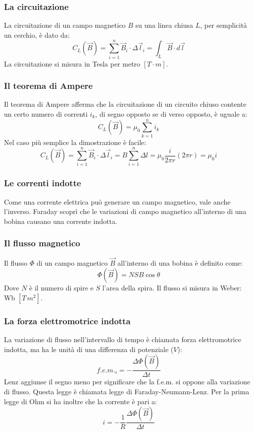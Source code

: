 \documentclass{article}
\begin{document}
\subsubsection{La circuitazione}
La circuitazione di un campo magnetico $B$ su una linea chiusa $L$, per semplicità un cerchio, è dato da:
\begin{equation}
    C_L(\Vec{B})=\sum_{i=1}^n \Vec{B}_i \cdot \Delta \Vec{l}_i=\int_L \Vec{B} \cdot d\Vec{l}
\end{equation}
La circuitazione si misura in Tesla per metro $[T\cdot m]$.

\subsubsection{Il teorema di Ampere}
Il teorema di Ampere afferma che la circuitazione di un circuito chiuso contente un certo numero di correnti $i_k$, di segno opposto se di verso opposto, è uguale a:
\begin{equation}
    C_L(\Vec{B})=\mu_0 \sum_{k=1}^n i_k
\end{equation}
Nel caso più semplice la dimostrazione è facile:
\begin{equation}
    C_L(\Vec{B})=\sum_{i=1}^n \Vec{B}_i \cdot \Delta \Vec{l}_i=B\sum_{i=1}^n \Delta l = \mu_0 \frac{i}{2\pi r}(2\pi r)=\mu_0 i
\end{equation}

\subsubsection{Le correnti indotte}
Come una corrente elettrica può generare un campo magnetico, vale anche l'inverso. Faraday scoprì che le variazioni di campo magnetico all'interno di una bobina causano una corrente indotta. 
\subsubsection{Il flusso magnetico}
Il flusso $\Phi$ di un campo magnetico $\Vec{B}$ all'interno di una bobina è definito come:
\begin{equation}
    \Phi (\Vec{B})=NSB\cos{\theta}
\end{equation}
Dove $N$ è il numero di spire e $S$ l'area della spira. Il flusso si misura in Weber: Wb $[T \, m^2]$.

\subsubsection{La forza elettromotrice indotta}
La variazione di flusso nell'intervallo di tempo è chiamata forza elettromotrice indotta, ma ha le unità di una differenza di potenziale ($V$):
\begin{equation}
    f.e.m._i=-\frac{\Delta \Phi (\Vec{B})}{\Delta t}
\end{equation}
Lenz aggiunse il segno meno per significare che la f.e.m. si oppone alla variazione di flusso. Questa legge è chiamata legge di Faraday-Neumann-Lenz.
Per la prima legge di Ohm si ha inoltre che la corrente è pari a:
\begin{equation}
    i=-\frac{1}{R}\frac{\Delta \Phi (\Vec{B})}{\Delta t}
\end{equation}
\end{document}
